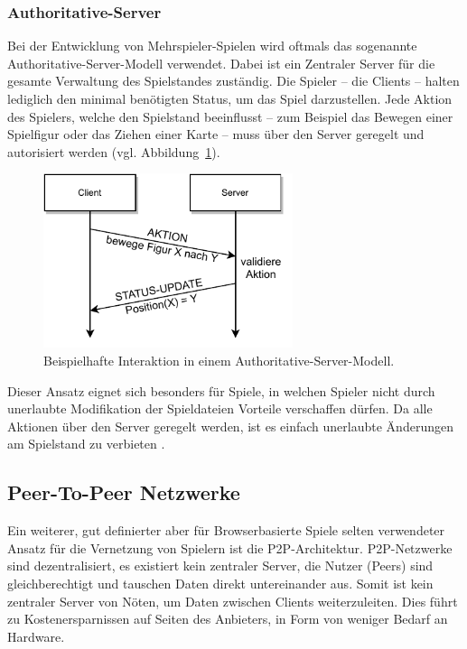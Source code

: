 \subsubsection{Authoritative-Server}
Bei der Entwicklung von Mehrspieler-Spielen wird oftmals das sogenannte \glqq{}Authoritative-Server\grqq{}-Modell verwendet. Dabei ist ein Zentraler Server für die gesamte Verwaltung des Spielstandes zuständig. Die Spieler -- die Clients -- halten lediglich den minimal benötigten Status, um das Spiel darzustellen. Jede Aktion des Spielers, welche den Spielstand beeinflusst -- zum Beispiel das Bewegen einer Spielfigur oder das Ziehen einer Karte -- muss über den Server geregelt und autorisiert werden \cite{authservermodel} (vgl. Abbildung~\ref{figure:authserver}).\par

\begin{figure}[h]
\centering
\includegraphics[width=0.65\textwidth]{bilder/PDF_SVG/AUTH_SERVER.pdf}
\caption{Beispielhafte Interaktion in einem Authoritative-Server-Modell.}
\label{figure:authserver}
\end{figure}

Dieser Ansatz eignet sich besonders für Spiele, in welchen Spieler nicht durch unerlaubte Modifikation der Spieldateien Vorteile verschaffen dürfen. Da alle Aktionen über den Server geregelt werden, ist es einfach unerlaubte Änderungen am Spielstand zu verbieten \cite{authservermodel}.\par

\subsection{Peer-To-Peer Netzwerke}
Ein weiterer, gut definierter aber für Browserbasierte Spiele selten verwendeter Ansatz für die Vernetzung von Spielern ist die \acf{P2P}-Architektur. \acs{P2P}-Netzwerke sind dezentralisiert, es existiert kein zentraler Server, die Nutzer (Peers) sind gleichberechtigt und tauschen Daten direkt untereinander aus. Somit ist kein zentraler Server von Nöten, um Daten zwischen Clients weiterzuleiten. Dies führt zu Kostenersparnissen auf Seiten des Anbieters, in Form von weniger Bedarf an Hardware.\par

